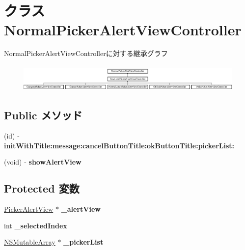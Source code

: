 \hypertarget{interface_normal_picker_alert_view_controller}{
\section{クラス NormalPickerAlertViewController}
\label{interface_normal_picker_alert_view_controller}
}
NormalPickerAlertViewControllerに対する継承グラフ\begin{figure}[H]
\begin{center}
\leavevmode
\includegraphics[height=1.411765cm]{interface_normal_picker_alert_view_controller}
\end{center}
\end{figure}
\subsection*{Public メソッド}
\begin{DoxyCompactItemize}
\item 
\hypertarget{interface_normal_picker_alert_view_controller_a386eae2a2ba84bce05ff99615a432bcd}{
(id) -\/ {\bfseries initWithTitle:message:cancelButtonTitle:okButtonTitle:pickerList:}}
\label{interface_normal_picker_alert_view_controller_a386eae2a2ba84bce05ff99615a432bcd}

\item 
\hypertarget{interface_normal_picker_alert_view_controller_a0b9f9e91d9e466f137630d1b364fef4c}{
(void) -\/ {\bfseries showAlertView}}
\label{interface_normal_picker_alert_view_controller_a0b9f9e91d9e466f137630d1b364fef4c}

\end{DoxyCompactItemize}
\subsection*{Protected 変数}
\begin{DoxyCompactItemize}
\item 
\hypertarget{interface_normal_picker_alert_view_controller_a52cae93ec164b45e664eba0bae2bcd78}{
\hyperlink{interface_picker_alert_view}{PickerAlertView} $\ast$ {\bfseries \_\-alertView}}
\label{interface_normal_picker_alert_view_controller_a52cae93ec164b45e664eba0bae2bcd78}

\item 
\hypertarget{interface_normal_picker_alert_view_controller_a6b7f56375aad98113501c7ecf6252968}{
int {\bfseries \_\-selectedIndex}}
\label{interface_normal_picker_alert_view_controller_a6b7f56375aad98113501c7ecf6252968}

\item 
\hypertarget{interface_normal_picker_alert_view_controller_a4ddbd309319ca46a9d2ce919924dc6a1}{
\hyperlink{class_n_s_mutable_array}{NSMutableArray} $\ast$ {\bfseries \_\-pickerList}}
\label{interface_normal_picker_alert_view_controller_a4ddbd309319ca46a9d2ce919924dc6a1}

\end{DoxyCompactItemize}
